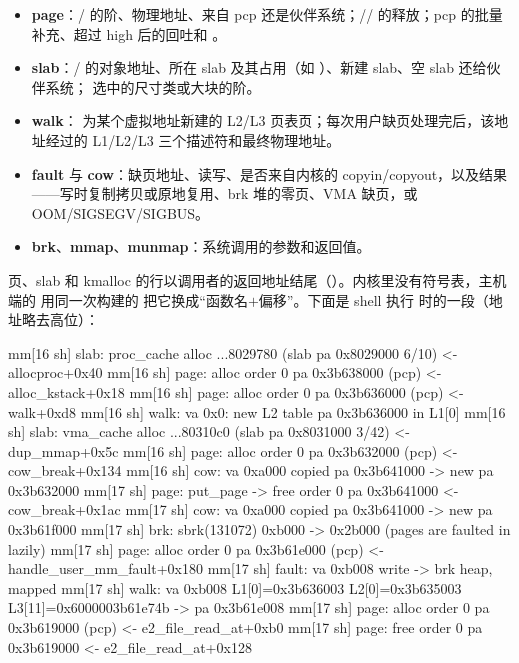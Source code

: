 \begin{itemize}
  \item \textbf{page}：/ 的阶、物理地址、来自 pcp 还是伙伴系统；// 的释放；pcp 的批量补充、超过 high 后的回吐和 。
  \item \textbf{slab}：/ 的对象地址、所在 slab 及其占用（如 ）、新建 slab、空 slab 还给伙伴系统； 选中的尺寸类或大块的阶。
  \item \textbf{walk}： 为某个虚拟地址新建的 L2/L3 页表页；每次用户缺页处理完后，该地址经过的 L1/L2/L3 三个描述符和最终物理地址。
  \item \textbf{fault} 与 \textbf{cow}：缺页地址、读写、是否来自内核的 copyin/copyout，以及结果——写时复制拷贝或原地复用、brk 堆的零页、VMA 缺页，或 OOM/SIGSEGV/SIGBUS。
  \item \textbf{brk}、\textbf{mmap}、\textbf{munmap}：系统调用的参数和返回值。
\end{itemize}

页、slab 和 kmalloc 的行以调用者的返回地址结尾（）。内核里没有符号表，主机端的  用同一次构建的  把它换成“函数名$+$偏移”。下面是 shell 执行  时的一段（地址略去高位）：

\begin{txtcode}
mm[16 sh] slab: proc_cache alloc ...8029780 (slab pa 0x8029000 6/10) <- allocproc+0x40
mm[16 sh] page: alloc order 0 pa 0x3b638000 (pcp) <- alloc_kstack+0x18
mm[16 sh] page: alloc order 0 pa 0x3b636000 (pcp) <- walk+0xd8
mm[16 sh] walk: va 0x0: new L2 table pa 0x3b636000 in L1[0]
mm[16 sh] slab: vma_cache alloc ...80310c0 (slab pa 0x8031000 3/42) <- dup_mmap+0x5c
mm[16 sh] page: alloc order 0 pa 0x3b632000 (pcp) <- cow_break+0x134
mm[16 sh] cow: va 0xa000 copied pa 0x3b641000 -> new pa 0x3b632000
mm[17 sh] page: put_page -> free order 0 pa 0x3b641000 <- cow_break+0x1ac
mm[17 sh] cow: va 0xa000 copied pa 0x3b641000 -> new pa 0x3b61f000
mm[17 sh] brk: sbrk(131072) 0xb000 -> 0x2b000 (pages are faulted in lazily)
mm[17 sh] page: alloc order 0 pa 0x3b61e000 (pcp) <- handle_user_mm_fault+0x180
mm[17 sh] fault: va 0xb008 write -> brk heap, mapped
mm[17 sh] walk: va 0xb008  L1[0]=0x3b636003 L2[0]=0x3b635003 L3[11]=0x6000003b61e74b
                -> pa 0x3b61e008
mm[17 sh] page: alloc order 0 pa 0x3b619000 (pcp) <- e2_file_read_at+0xb0
mm[17 sh] page: free  order 0 pa 0x3b619000 <- e2_file_read_at+0x128
\end{txtcode}

